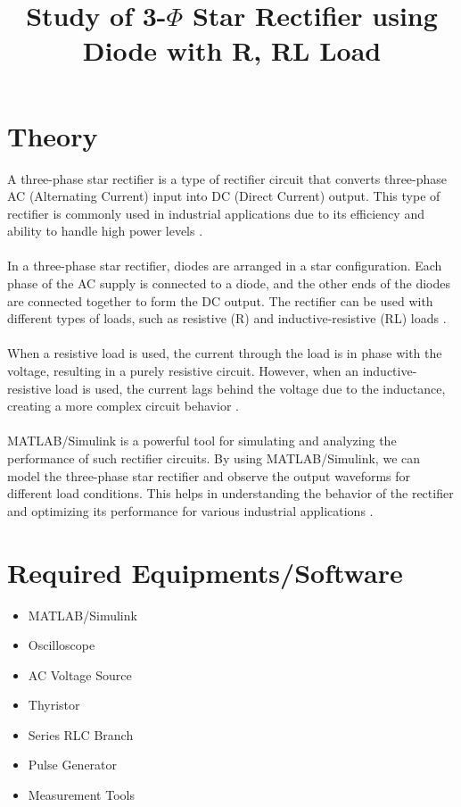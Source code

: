 \documentclass[12pt]{article}
\title{Study of 3-\(\Phi\) Star Rectifier using Diode with R, RL Load}
\author{}
\date{}
\begin{document}


\pagebreak

\tableofcontents

\pagebreak
{}
\maketitle

\section*{Theory}
A three-phase star rectifier is a type of rectifier circuit that converts three-phase AC (Alternating Current) input into DC (Direct Current) output. This type of rectifier is commonly used in industrial applications due to its efficiency and ability to handle high power levels \cite{power_electronics}.
\\\\
In a three-phase star rectifier, diodes are arranged in a star configuration. Each phase of the AC supply is connected to a diode, and the other ends of the diodes are connected together to form the DC output. The rectifier can be used with different types of loads, such as resistive (R) and inductive-resistive (RL) loads \cite{rectifier_design}.
\\\\
When a resistive load is used, the current through the load is in phase with the voltage, resulting in a purely resistive circuit. However, when an inductive-resistive load is used, the current lags behind the voltage due to the inductance, creating a more complex circuit behavior \cite{electrical_machines}.
\\\\
MATLAB/Simulink is a powerful tool for simulating and analyzing the performance of such rectifier circuits. By using MATLAB/Simulink, we can model the three-phase star rectifier and observe the output waveforms for different load conditions. This helps in understanding the behavior of the rectifier and optimizing its performance for various industrial applications \cite{simulink_guide}.


\section*{Required Equipments/Software}
\begin{itemize}
    \item MATLAB/Simulink
    \item Oscilloscope
    \item AC Voltage Source
    \item Thyristor
    \item Series RLC Branch
    \item Pulse Generator
    \item Measurement Tools
\end{itemize}
\end{document}
